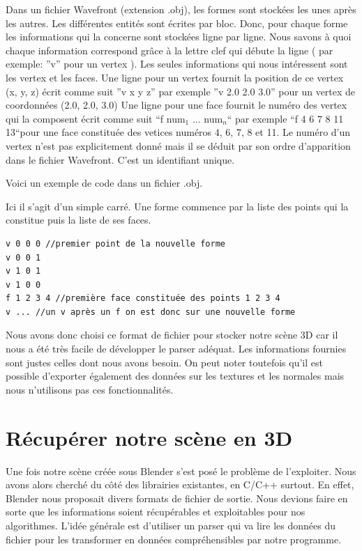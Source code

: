 \documentclass[a4paper,12pt]{report}
\begin{document}
Dans un fichier Wavefront (extension .obj), les formes sont stockées les unes après les autres. Les différentes entités sont écrites par bloc.
Donc, pour chaque forme les informations qui la concerne sont stockées ligne par ligne. Nous savons à quoi chaque information correspond grâce à la lettre clef qui débute la ligne ( par exemple: ''v'' pour un vertex ).
Les seules informations qui nous intéressent sont les vertex et les faces. 
Une ligne pour un vertex fournit la position de ce vertex (x, y, z) écrit comme suit ''v x y z'' par exemple ''v 2.0 2.0 3.0'' pour un vertex de coordonnées (2.0, 2.0, 3.0)
Une ligne pour une face fournit le numéro des vertex qui la composent écrit comme suit ``f num$_{1}$ ... num$_{n}$`` par exemple ``f 4 6 7 8 11 13``pour une face constituée des vetices numéros 4, 6, 7, 8 et 11. Le numéro d'un vertex n'est pas explicitement donné mais il se déduit par son ordre d'apparition dans le fichier Wavefront. C'est un identifiant unique.

Voici un exemple de code dans un fichier .obj.

Ici il s'agit d'un simple carré. Une forme commence par la liste des points qui la constitue puis la liste de ses faces.

\begin{verbatim}
v 0 0 0 //premier point de la nouvelle forme
v 0 0 1
v 1 0 1
v 1 0 0
f 1 2 3 4 //première face constituée des points 1 2 3 4
v ... //un v après un f on est donc sur une nouvelle forme
\end{verbatim}

Nous avons donc choisi ce format de fichier pour stocker notre scène 3D car il nous a été très facile de développer le parser adéquat. Les informations fournies sont justes celles dont nous avons besoin. On peut noter toutefois qu'il est possible d'exporter également des données sur les textures et les normales mais nous n'utilisons pas ces fonctionnalités.

\section{Récupérer notre scène en 3D}
 
Une fois notre scène créée sous Blender s'est posé le problème de l'exploiter. Nous avons alors cherché du côté des librairies existantes, en C/C++ surtout. En effet, Blender nous proposait divers formats de fichier de sortie. Nous devions faire en sorte que les informations soient récupérables et exploitables pour nos algorithmes. L'idée générale est d'utiliser un parser qui va lire les données du fichier pour les transformer en données compréhensibles par notre programme.
\end{document}
